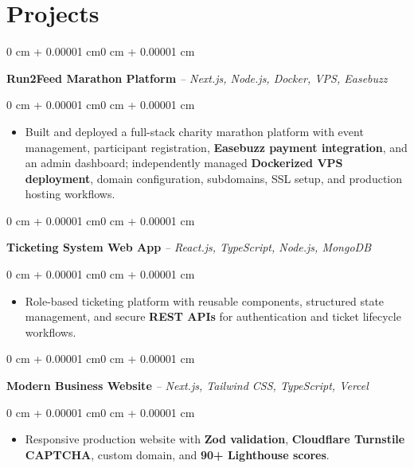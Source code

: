 \documentclass[10pt, letterpaper]{article}
\newenvironment{highlights}{
    \begin{itemize}[
        topsep=0.10 cm,
        parsep=0.10 cm,
        partopsep=0pt,
        itemsep=0pt,
        leftmargin=0 cm + 10pt
    ]
}{\end{itemize}}
\newenvironment{onecolentry}{
    \begin{adjustwidth}{0 cm + 0.00001 cm}{0 cm + 0.00001 cm}
}{\end{adjustwidth}}
\begin{document}
    \section{Projects}

    \begin{onecolentry}
        \textbf{Run2Feed Marathon Platform}
        \textit{-- Next.js, Node.js, Docker, VPS, Easebuzz}
    \end{onecolentry}
    \vspace{0.10 cm}
    \begin{onecolentry}
        \begin{highlights}
            \item Built and deployed a full-stack charity marathon platform with event management,
participant registration, \textbf{Easebuzz payment integration}, and an admin dashboard;
independently managed \textbf{Dockerized VPS deployment}, domain configuration,
subdomains, SSL setup, and production hosting workflows.
        \end{highlights}
    \end{onecolentry}

    \vspace{0.08 cm}

    \begin{onecolentry}
        \textbf{Ticketing System Web App}
        \textit{-- React.js, TypeScript, Node.js, MongoDB}
    \end{onecolentry}
    \vspace{0.10 cm}
    \begin{onecolentry}
        \begin{highlights}
            \item Role-based ticketing platform with reusable components, structured
            state management, and secure \textbf{REST APIs} for authentication and
            ticket lifecycle workflows.
        \end{highlights}
    \end{onecolentry}

    \vspace{0.08 cm}

    \begin{onecolentry}
        \textbf{Modern Business Website}
        \textit{-- Next.js, Tailwind CSS, TypeScript, Vercel}
    \end{onecolentry}
    \vspace{0.10 cm}
    \begin{onecolentry}
        \begin{highlights}
            \item Responsive production website with \textbf{Zod validation},
            \textbf{Cloudflare Turnstile CAPTCHA}, custom domain, and
            \textbf{90+ Lighthouse scores}.
        \end{highlights}
    \end{onecolentry}
\end{document}
